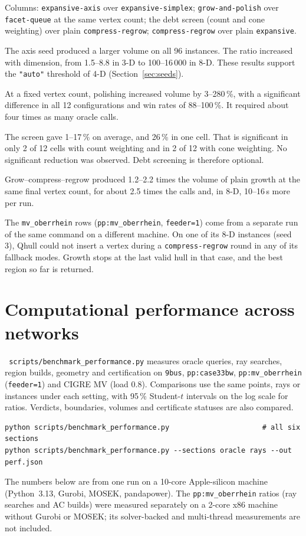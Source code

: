 \documentclass[11pt,a4paper]{report}
\newcommand{\code}[1]{\texttt{\small #1}}
\newcommand{\file}[1]{\texttt{\small\color{nbgrey} #1}}
\begin{document}
\noindent Columns: \code{expansive-axis} over \code{expansive-simplex};
\code{grow-and-polish} over \code{facet-queue} at the same vertex count; the
debt screen (count and cone weighting) over plain \code{compress-regrow};
\code{compress-regrow} over plain \code{expansive}.
\begin{description}[itemsep=0.1em]
\item[Seed] The axis seed produced a larger volume on all 96 instances. The
  ratio increased with dimension, from 1.5--8.8 in 3-D to 100--16\,000 in 8-D.
  These results support the \code{"auto"} threshold of 4-D
  (Section~\ref{sec:seeds}).
\item[Relocation] At a fixed vertex count, polishing increased volume by
  3--280\,\%, with a significant difference in all 12 configurations and
  win rates of 88--100\,\%. It required about four times as many oracle calls.
\item[Debt screening] The screen gave 1--17\,\% on average, and 26\,\% in one
  cell. That is significant in only 2 of 12 cells with count weighting and in
  2 of 12 with cone weighting. No significant reduction was observed. Debt
  screening is therefore optional.
\item[Compression] Grow--compress--regrow produced 1.2--2.2 times the volume of plain
  growth at the same final vertex count, for about 2.5 times the calls and,
  in 8-D, 10--16\,s more per run.
\end{description}
The \code{mv\_oberrhein} rows (\code{pp:mv\_oberrhein}, \code{feeder=1}) come
from a separate run of the same command on a different machine. On one of its
8-D instances (seed 3), Qhull could not insert a vertex during a
\code{compress-regrow} round in any of its fallback modes. Growth stops at the
last valid hull in that case, and the best region so far is returned.

\section{Computational performance across networks}
\label{sec:performance}

\file{scripts/benchmark\_performance.py} measures oracle queries, ray searches,
region builds, geometry and certification on \code{9bus}, \code{pp:case33bw},
\code{pp:mv\_oberrhein} (\code{feeder=1}) and CIGRE MV (load 0.8). Comparisons use the same points, rays or
instances under each setting, with 95\,\% Student-$t$ intervals on the log
scale for ratios. Verdicts, boundaries, volumes and certificate statuses are
also compared.
\begin{lstlisting}
python scripts/benchmark_performance.py                      # all six sections
python scripts/benchmark_performance.py --sections oracle rays --out perf.json
\end{lstlisting}
The numbers below are from one run on a 10-core Apple-silicon machine
(Python~3.13, Gurobi, MOSEK, pandapower). The \code{pp:mv\_oberrhein} ratios
(ray searches and AC builds) were measured separately on a 2-core x86 machine
without Gurobi or MOSEK; its solver-backed and multi-thread measurements are
not included.
\end{document}
